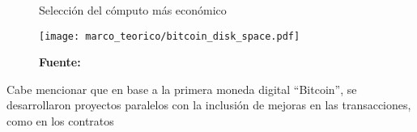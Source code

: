 \documentclass[../main/main.tex]{subfiles}
\begin{document}
  \begin{figure}[ht]
    \centering
    \caption{Selección del cómputo más económico}
    \texttt{[image: marco\_teorico/bitcoin\_disk\_space.pdf]}
    \caption*{\textbf{Fuente:} \cite[p.~4]{article:satoshi_bitcoin}}
    \label{fig:bitcoin_disk_space}
  \end{figure}

  Cabe mencionar que en base a la primera moneda digital ``Bitcoin'', se desarrollaron proyectos paralelos con la inclusión de mejoras en las transacciones, como en los contratos
\end{document}
